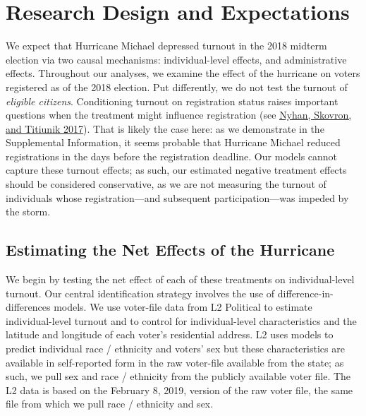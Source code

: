 \documentclass[
  12pt,
]{article}
\begin{document}
\hypertarget{research-design-and-expectations}{%
\section*{Research Design and Expectations}\label{research-design-and-expectations}}

We expect that Hurricane Michael depressed turnout in the 2018 midterm election via two causal mechanisms: individual-level effects, and administrative effects. Throughout our analyses, we examine the effect of the hurricane on voters registered as of the 2018 election. Put differently, we do not test the turnout of \emph{eligible citizens}. Conditioning turnout on registration status raises important questions when the treatment might influence registration (see \protect\hyperlink{ref-Nyhan2017}{Nyhan, Skovron, and Titiunik 2017}). That is likely the case here: as we demonstrate in the Supplemental Information, it seems probable that Hurricane Michael reduced registrations in the days before the registration deadline. Our models cannot capture these turnout effects; as such, our estimated negative treatment effects should be considered conservative, as we are not measuring the turnout of individuals whose registration---and subsequent participation---was impeded by the storm.

\hypertarget{estimating-the-net-effects-of-the-hurricane}{%
\subsection*{Estimating the Net Effects of the Hurricane}\label{estimating-the-net-effects-of-the-hurricane}}

We begin by testing the net effect of each of these treatments on individual-level turnout. Our central identification strategy involves the use of difference-in-differences models. We use voter-file data from L2 Political to estimate individual-level turnout and to control for individual-level characteristics and the latitude and longitude of each voter's residential address. L2 uses models to predict individual race / ethnicity and voters' sex but these characteristics are available in self-reported form in the raw voter-file available from the state; as such, we pull sex and race / ethnicity from the publicly available voter file. The L2 data is based on the February 8, 2019, version of the raw voter file, the same file from which we pull race / ethnicity and sex.
\end{document}
